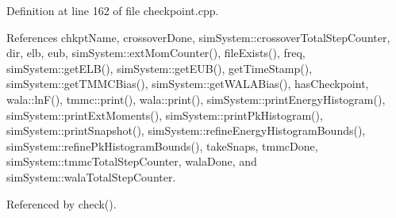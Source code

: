 Definition at line 162 of file checkpoint.\-cpp.



References chkpt\-Name, crossover\-Done, sim\-System\-::crossover\-Total\-Step\-Counter, dir, elb, eub, sim\-System\-::ext\-Mom\-Counter(), file\-Exists(), freq, sim\-System\-::get\-E\-L\-B(), sim\-System\-::get\-E\-U\-B(), get\-Time\-Stamp(), sim\-System\-::get\-T\-M\-M\-C\-Bias(), sim\-System\-::get\-W\-A\-L\-A\-Bias(), has\-Checkpoint, wala\-::ln\-F(), tmmc\-::print(), wala\-::print(), sim\-System\-::print\-Energy\-Histogram(), sim\-System\-::print\-Ext\-Moments(), sim\-System\-::print\-Pk\-Histogram(), sim\-System\-::print\-Snapshot(), sim\-System\-::refine\-Energy\-Histogram\-Bounds(), sim\-System\-::refine\-Pk\-Histogram\-Bounds(), take\-Snaps, tmmc\-Done, sim\-System\-::tmmc\-Total\-Step\-Counter, wala\-Done, and sim\-System\-::wala\-Total\-Step\-Counter.



Referenced by check().


